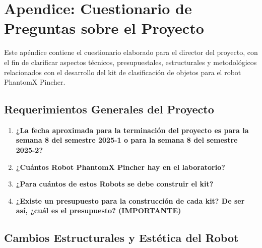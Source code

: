 \chapter{Apendice: Cuestionario de Preguntas sobre el Proyecto}

Este apéndice contiene el cuestionario elaborado para el director del proyecto, con el fin de clarificar aspectos técnicos, presupuestales, estructurales y metodológicos relacionados con el desarrollo del kit de clasificación de objetos para el robot PhantomX Pincher.

\section{Requerimientos Generales del Proyecto}

\begin{enumerate}
    \item \textbf{¿La fecha aproximada para la terminación del proyecto es para la semana 8 del semestre 2025-1 o para la semana 8 del semestre 2025-2?}
    
    \item \textbf{¿Cuántos Robot PhantomX Pincher hay en el laboratorio?}
    
    \item \textbf{¿Para cuántos de estos Robots se debe construir el kit?}
    
    \item \textbf{¿Existe un presupuesto para la construcción de cada kit? De ser así, ¿cuál es el presupuesto? (IMPORTANTE)}
\end{enumerate}

\section{Cambios Estructurales y Estética del Robot}

